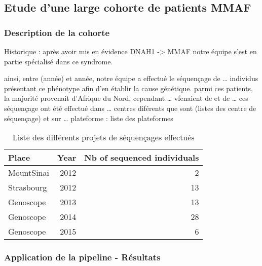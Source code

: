 \documentclass[12pt,twoside]{reedthesis}
\theoremstyle{definition}
\theoremstyle{definition}
\theoremstyle{remark}
\begin{document}
  \newpage
  
  \subsection{Etude d'une large cohorte de patients
  MMAF}\label{cohortemmah}
  
  \subsubsection{Description de la
  cohorte}\label{description-de-la-cohorte}
  
  Historique : après avoir mis en évidence DNAH1 -\textgreater{} MMAF
  notre équipe s'est en partie spécialisé dans ce syndrome.
  
  ainsi, entre (année) et année, notre équipe a effectué le séquençage de
  \ldots{} individus présentant ce phénotype afin d'en établir la cause
  génétique. parmi ces patients, la majorité provenait d'Afrique du Nord,
  cependant \ldots{} vfenaient de et de \ldots{} ces séquençage ont été
  effectué dans \ldots{} centres diférents que sont (listes des centre de
  séquençage) et sur \ldots{} plateforme : liste des plateformes
  
  \newpage
  
  \begin{table}
  
  \caption{\label{tab:tabcohort}Liste des différents projets de séquençages effectués}
  \centering
  \begin{tabular}[t]{l|r|r}
  \hline
  Place & Year & Nb of sequenced individuals\\
  \hline
  MountSinai & 2012 & 2\\
  \hline
  Strasbourg & 2012 & 13\\
  \hline
  Genoscope & 2013 & 13\\
  \hline
  Genoscope & 2014 & 28\\
  \hline
  Genoscope & 2015 & 6\\
  \hline
  \end{tabular}
  \end{table}
  
  \newpage
  
  \subsubsection{Application de la pipeline -
  Résultats}\label{application-de-la-pipeline---resultats}
  
\end{document}
